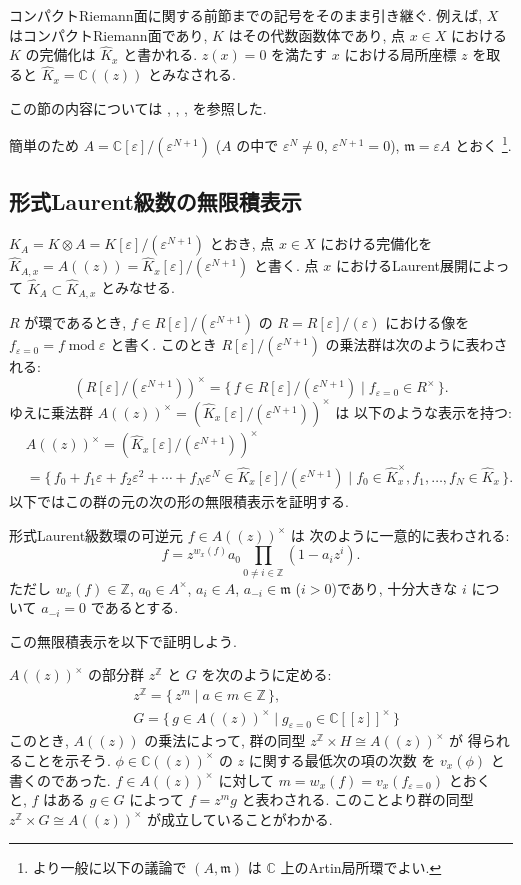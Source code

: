 \documentclass[12pt,twoside]{jarticle}
\newcommand\Z{{\mathbb Z}} %
\newcommand\C{{\mathbb C}} %
\theoremstyle{definition} %
\theoremstyle{definition} %
\theoremstyle{definition} %
\numberwithin{theorem}{section}
\numberwithin{equation}{section}
\numberwithin{figure}{section}
\numberwithin{table}{section}
\newcommand\Khat{{\widehat K}}
\newcommand\eps{\varepsilon}
\newcommand\m{{\mathfrak m}}
\newcommand\MOD{\operatorname{mod}}
\begin{document}
コンパクトRiemann面に関する前節までの記号をそのまま引き継ぐ.
例えば, $X$ はコンパクトRiemann面であり, $K$ はその代数函数体であり,
点 $x\in X$ における $K$ の完備化は $\Khat_x$ と書かれる.
$z(x)=0$ を満たす $x$ における局所座標 $z$ を取ると $\Khat_x=\C((z))$
とみなされる.

この節の内容については \cite{kerr},
\cite{pablosromo}, \cite{luo}, \cite{horozov-luo}を参照した.

簡単のため $A=\C[\eps]/(\eps^{N+1})$ ($A$ の中で $\eps^N\ne0$, $\eps^{N+1}=0$),
$\m=\eps A$ とおく%
\footnote{より一般に以下の議論で $(A,\m)$ は $\C$ 上のArtin局所環でよい.}.


\subsection{形式Laurent級数の無限積表示}

$K_A=K\otimes A=K[\eps]/(\eps^{N+1})$ とおき,
点 $x\in X$ における完備化を $\Khat_{A,x}=A((z))=\Khat_x[\eps]/(\eps^{N+1})$ と書く.
点 $x$ におけるLaurent展開によって $\Khat_A\subset\Khat_{A,x}$ とみなせる.

$R$ が環であるとき, $f\in R[\eps]/(\eps^{N+1})$ の $R=R[\eps]/(\eps)$
における像を $f_{\eps=0}=f\MOD\eps$ と書く.
このとき $R[\eps]/(\eps^{N+1})$ の乗法群は次のように表わされる:
\[
 \left( R[\eps]/(\eps^{N+1}) \right)^\times
 =\{\, f\in R[\eps]/(\eps^{N+1}) \mid f_{\eps=0}\in R^\times \,\}.
\]
ゆえに乗法群 $A((z))^\times=\left(\Khat_x[\eps]/(\eps^{N+1})\right)^\times$ は
以下のような表示を持つ:
\begin{align*}
&
A((z))^\times = \left(\Khat_x[\eps]/(\eps^{N+1})\right)^\times
\\ &
=
\{\, f_0+f_1\eps+f_2\eps^2+\cdots+f_N\eps^N \in\Khat_x[\eps]/(\eps^{N+1})
\mid f_0\in\Khat_x^\times, f_1,\ldots,f_N\in\Khat_x \,\}.
\end{align*}
以下ではこの群の元の次の形の無限積表示を証明する.

形式Laurent級数環の可逆元 $f\in A((z))^\times$ は
次のように一意的に表わされる:
\[
f = z^{w_x(f)}a_0\prod_{0\ne i\in\Z}(1-a_i z^i).
\]
ただし $w_x(f)\in\Z$, $a_0\in A^\times$, $a_i\in A$, $a_{-i}\in\m$ ($i>0$)であり,
十分大きな $i$ について $a_{-i}=0$ であるとする.

この無限積表示を以下で証明しよう.

$A((z))^\times$ の部分群 $z^\Z$ と $G$ を次のように定める:
\begin{align*}
&
z^\Z = \{\, z^m \mid a\in m\in \Z \,\},
\\ &
G=\{\,g\in A((z))^\times\mid g_{\eps=0}\in \C[[z]]^\times \,\}
\end{align*}
このとき, $A((z))$ の乗法によって,
群の同型 $z^\Z\times H \cong A((z))^\times$ が
得られることを示そう.
$\phi\in\C((z))^\times$ の $z$ に関する最低次の項の次数
を $v_x(\phi)$ と書くのであった.
$f\in A((z))^\times$ に対して $m=w_x(f)=v_x(f_{\eps=0})$ とおく
と, $f$ はある $g\in G$ によって $f=z^m g$ と表わされる.
このことより群の同型 $z^\Z\times G \cong A((z))^\times$
が成立していることがわかる.
\end{document}
